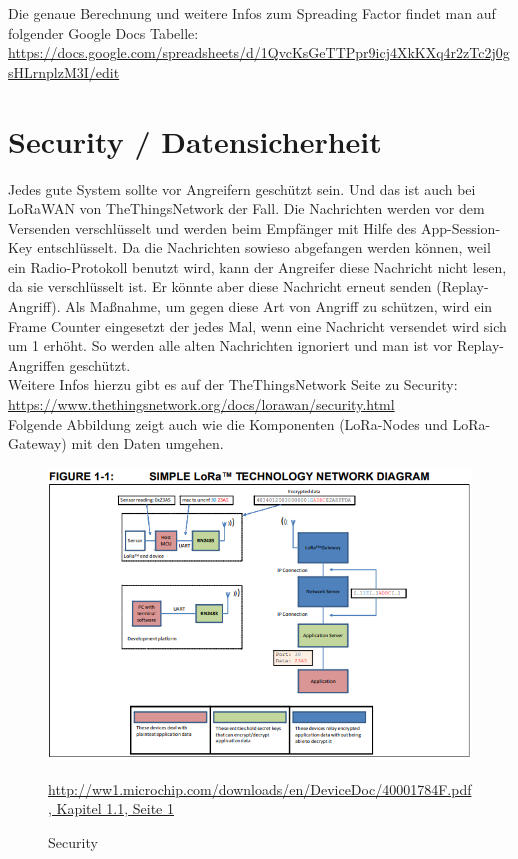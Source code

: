 Die genaue Berechnung und weitere Infos zum Spreading Factor findet man auf folgender Google Docs Tabelle: \url{https://docs.google.com/spreadsheets/d/1QvcKsGeTTPpr9icj4XkKXq4r2zTc2j0gsHLrnplzM3I/edit}

\section{Security / Datensicherheit}
Jedes gute System sollte vor Angreifern geschützt sein. Und das ist auch bei LoRaWAN von TheThingsNetwork der Fall. Die Nachrichten werden vor dem Versenden verschlüsselt und werden beim Empfänger mit Hilfe des App-Session-Key entschlüsselt. Da die Nachrichten sowieso abgefangen werden können, weil ein Radio-Protokoll benutzt wird, kann der Angreifer diese Nachricht nicht lesen, da sie verschlüsselt ist. Er könnte aber diese Nachricht erneut senden (Replay-Angriff). Als Maßnahme, um gegen diese Art von Angriff zu schützen, wird ein Frame Counter eingesetzt der jedes Mal, wenn eine Nachricht versendet wird sich um 1 erhöht. So werden alle alten Nachrichten ignoriert und man ist vor Replay-Angriffen geschützt.\\

Weitere Infos hierzu gibt es auf der TheThingsNetwork Seite zu Security: \url{https://www.thethingsnetwork.org/docs/lorawan/security.html}\\

Folgende Abbildung zeigt auch wie die Komponenten (LoRa-Nodes und LoRa-Gateway) mit den Daten umgehen.
\begin{figure}[ht]
    \center
    \includegraphics[width=15cm]{Bilder/lora-11.png}\\
    \caption{Security}
    \begin{center} \quelle\url{http://ww1.microchip.com/downloads/en/DeviceDoc/40001784F.pdf, Kapitel 1.1, Seite 1} \end{center}
        \label{fig:security}
\end{figure}

